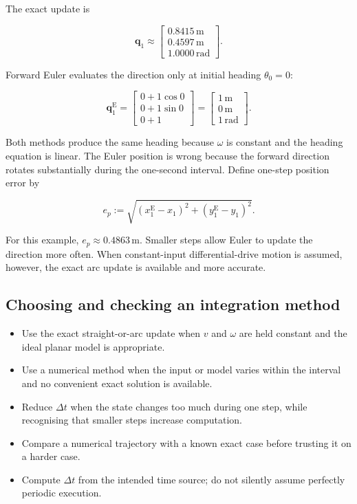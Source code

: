 \documentclass[
  australian,
  12pt,
  letterpaper,
  DIV=11,
  numbers=noendperiod,
  twoside]{scrreprt}
\providecommand{\tightlist}{%
  \setlength{\itemsep}{0pt}\setlength{\parskip}{0pt}}
\begin{document}
The exact update is

\[
\mathbf q_1
\approx
\begin{bmatrix}
0.8415\,\mathrm m\\
0.4597\,\mathrm m\\
1.0000\,\mathrm{rad}
\end{bmatrix}.
\]

Forward Euler evaluates the direction only at initial heading
\(\theta_0=0\):

\[
\mathbf q_1^{\mathrm E}
=
\begin{bmatrix}
0+1\cos0\\
0+1\sin0\\
0+1
\end{bmatrix}
=
\begin{bmatrix}
1\,\mathrm m\\
0\,\mathrm m\\
1\,\mathrm{rad}
\end{bmatrix}.
\]

Both methods produce the same heading because \(\omega\) is constant and
the heading equation is linear. The Euler position is wrong because the
forward direction rotates substantially during the one-second interval.
Define one-step position error by

\[
e_p
\mathrel{:=}
\sqrt{(x_1^{\mathrm E}-x_1)^2+(y_1^{\mathrm E}-y_1)^2}.
\]

For this example, \(e_p\approx0.4863\,\mathrm m\). Smaller steps allow
Euler to update the direction more often. When constant-input
differential-drive motion is assumed, however, the exact arc update is
available and more accurate.

\subsection{Choosing and checking an integration
method}\label{choosing-and-checking-an-integration-method}

\begin{itemize}
\tightlist
\item
  Use the exact straight-or-arc update when \(v\) and \(\omega\) are
  held constant and the ideal planar model is appropriate.
\item
  Use a numerical method when the input or model varies within the
  interval and no convenient exact solution is available.
\item
  Reduce \(\Delta t\) when the state changes too much during one step,
  while recognising that smaller steps increase computation.
\item
  Compare a numerical trajectory with a known exact case before trusting
  it on a harder case.
\item
  Compute \(\Delta t\) from the intended time source; do not silently
  assume perfectly periodic execution.
\end{itemize}
\end{document}
